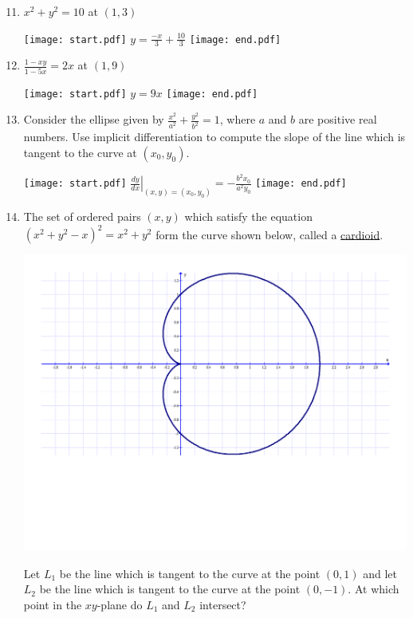 \documentclass[12pt]{article}
\begin{document}
\begin{enumerate}
\setcounter{enumi}{10}

\item $x^2+y^2 = 10$ at $(1,3)$ 

\texttt{[image: start.pdf]}
{{$y=\frac{-x}{3}+\frac{10}{3}$}}
\texttt{[image: end.pdf]}


\item $\frac{1-xy}{1-5x}=2x$ at $(1,9)$ 

\texttt{[image: start.pdf]}
{{$y=9x$}}
\texttt{[image: end.pdf]}


\item Consider the ellipse given by $\frac{x^2}{a^2}+\frac{y^2}{b^2}=1$, where $a$ and $b$ are positive real numbers.  Use implicit differentiation to compute the slope of the line which is tangent to the curve at $(x_0,y_0)$.

\texttt{[image: start.pdf]}
{{$\left.\frac{dy}{dx}\right|_{(x,y)=(x_0,y_0)}=-\frac{b^2x_0}{a^2y_0}$}}
\texttt{[image: end.pdf]}


\item The set of ordered pairs $(x,y)$ which satisfy the equation $(x^2+y^2-x)^2=x^2+y^2$ form the curve shown below, called a \underline{cardioid}.

\begin{center}
\includegraphics[scale=0.4]{cardioid.pdf}
\end{center}

Let $L_1$ be the line which is tangent to the curve at the point $(0,1)$ and let $L_2$ be the line which is tangent to the curve at the point $(0,-1)$.  At which point in the $xy$-plane do $L_1$ and $L_2$ intersect?


\end{enumerate}
\end{document}
